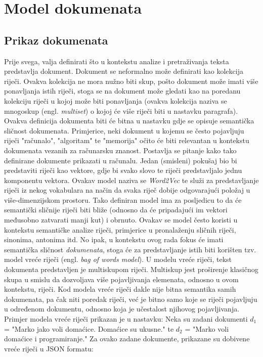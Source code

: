 \documentclass[times, utf8, zavrsni]{fer}
\begin{document}
\chapter{Model dokumenata}
\label{docmodel}

\section{Prikaz dokumenata}
\label{subchap:docmodel_docview}
Prije svega, valja definirati što u kontekstu analize i pretraživanja teksta predstavlja dokument. Dokument se neformalno može definirati kao kolekcija riječi. Ovakva kolekcija ne mora nužno biti skup, pošto dokument može imati više ponavljanja istih riječi, stoga se na dokument može gledati kao na poredanu kolekciju riječi u kojoj može biti ponavljanja  (ovakva kolekcija naziva se mnogoskup (engl. \textit{multiset}) o kojoj će više riječi biti u nastavku paragrafa). Ovakva definicija dokumenta biti će bitna u nastavku gdje se opisuje semantička sličnost dokumenata. Primjerice, neki dokument u kojemu se često pojavljuju riječi "računalo", "algoritam" te "memorija" očito će biti relevantan u kontekstu dokumenata vezanih za računarsku znanost. Postavlja se pitanje kako tako definirane dokumente prikazati u računalu. Jedan (smisleni) pokušaj bio bi predstaviti riječi kao vektore, gdje bi svako slovo te riječi predstavljalo jednu komponentu vektora. Ovakav model naziva se \textit{Word2Vec} te služi za predstavljanje riječi iz nekog vokabulara na način da svaka riječ dobije odgovarajući položaj u više-dimenzijskom prostoru. Tako definiran model ima za posljedicu to da će semantički sličnije riječi biti bliže (odnosno da će pripadajući im vektori međusobno zatvarati manji kut) i obrnuto. Ovakav se model često koristi u kontekstu semantičke analize riječi, primjerice u pronalaženju sličnih riječi, sinonima, antonima itd. No ipak, u kontekstu ovog rada fokus će imati semantička sličnost \textit{dokumenata}, stoga će za predstavljanje istih biti korišten tzv. model vreće riječi (engl. \textit{bag of words model}). U modelu vreće riječi, tekst dokumenta predstavljen je multiskupom riječi. Multiskup jest proširenje klasičnog skupa u smislu da dozvoljava više pojavljivanja elemenata, odnosno u ovom kontekstu, riječi. Kod modela vreće riječi dakle nije bitna semantika samih dokumenata, pa čak niti poredak riječi, već je bitno samo koje se riječi pojavljuju u određenom dokumentu, odnosno koja je učestalost njihovog pojavljivanja. Primjer modela vreće riječi prikazan je u nastavku:
Neka su zadani dokumenti $d_{1}$ = "Marko jako voli domaćice. Domaćice su ukusne." te $d_{2}$ = "Marko voli domaćice i programiranje." Za ovako zadane dokumente, prikazane su dobivene vreće riječi u JSON formatu:
\end{document}
